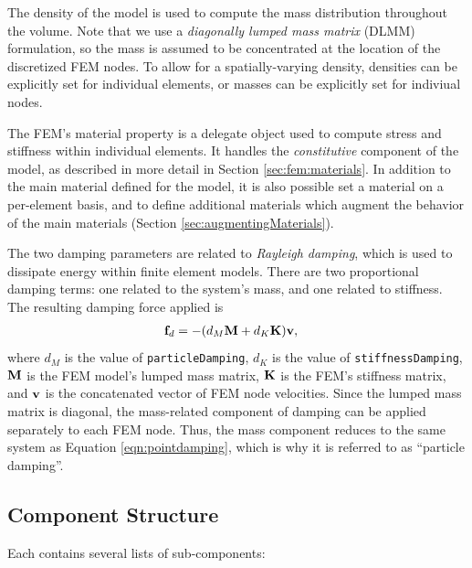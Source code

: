 The density of the model is used to compute the mass distribution
throughout the volume.  Note that we use a \emph{diagonally lumped
mass matrix} (DLMM) formulation, so the mass is assumed to be
concentrated at the location of the discretized FEM nodes.  To allow
for a spatially-varying density, densities can be explicitly set for
individual elements, or masses can be explicitly set for indiviual
nodes.

The FEM's {\sf material} property is a delegate object used to compute
stress and stiffness within individual elements.  It handles
the \emph{constitutive} component of the model, as described in more
detail in Section \ref{sec:fem:materials}.
In addition to the main material defined
for the model, it is also possible set a material on a per-element
basis, and to define additional materials which augment the behavior
of the main materials (Section \ref{sec:augmentingMaterials}).

The two damping parameters are related to \emph{Rayleigh damping}, which
is used to dissipate energy within finite element models.  There are two 
proportional damping terms: one related to the system's mass, and one related 
to stiffness.  The resulting damping force applied is
\begin{align}
	{\bf f}_d & = - (d_M {\bf M} + d_K{\bf K}){\bf v},
\end{align}
where $d_M$ is the value of {\tt particleDamping}, $d_K$ is the value of 
{\tt stiffnessDamping}, ${\bf M}$ is the FEM model's lumped mass matrix, ${\bf K}$ is 
the FEM's stiffness matrix, and ${\bf v}$ is the concatenated vector of FEM node
velocities.  Since the lumped mass matrix is diagonal, the mass-related
component of damping can be applied separately to each FEM node.  Thus, the
mass component reduces to the same system as Equation \eqref{eqn:pointdamping},
which is why it is referred to as ``particle damping''.

\subsection{Component Structure}
\label{sec:componentStructure}

Each  contains several 
lists of sub-components:

